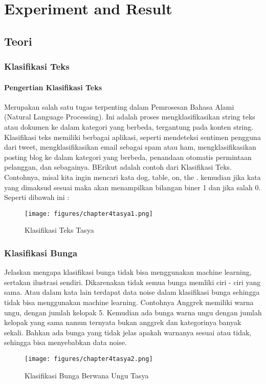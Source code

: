 \chapter{Experiment and Result}
\section{Teori}
\subsection{Klasifikasi Teks}
\subsubsection{Pengertian Klasifikasi Teks}
Merupakan salah satu tugas terpenting dalam Pemrosesan Bahasa Alami (Natural Language Processing). Ini adalah proses mengklasifikasikan string teks atau dokumen ke dalam kategori yang berbeda, tergantung pada konten string. Klasifikasi teks memiliki berbagai aplikasi, seperti mendeteksi sentimen pengguna dari tweet, mengklasifikasikan email sebagai spam atau ham, mengklasifikasikan posting blog ke dalam kategori yang berbeda, penandaan otomatis permintaan pelanggan, dan sebagainya. BErikut adalah contoh dari Klasifikasi Teks.
Contohnya, misal kita ingin mencari kata dog, table, on, the . kemudian jika kata yang dimaksud sesuai maka akan menampilkan bilangan biner 1 dan jika salah 0. Seperti dibawah ini :
\begin{figure}[ht]
\centering
\texttt{[image: figures/chapter4tasya1.png]}
\caption{Klasifikasi Teks Tasya}
\label{Contoh}
\end{figure}

\subsection{Klasifikasi Bunga}
Jelaskan mengapa klasifikasi bunga tidak bisa menggunakan machine learning, sertakan ilustrasi sendiri.
Dikarenakan tidak semua bunga memliki ciri - ciri yang sama. Atau dalam kata lain terdapat data noise dalam klasifikasi bunga sehingga tidak bisa menggunakan machine learning.
Contohnya Anggrek memiliki warna ungu, dengan jumlah kelopak 5. Kemudian ada bunga warna ungu dengan jumlah kelopak yang sama namun ternyata bukan anggrek dan kategorinya banyak sekali. Bahkan ada bunga yang tidak jelas apakah warnanya sesuai atau tidak, sehingga bisa menyebabkan data noise.
\begin{figure}[ht]
\centering
\texttt{[image: figures/chapter4tasya2.png]}
\caption{Klasifikasi Bunga Berwana Ungu Tasya}
\label{Contoh}
\end{figure}

